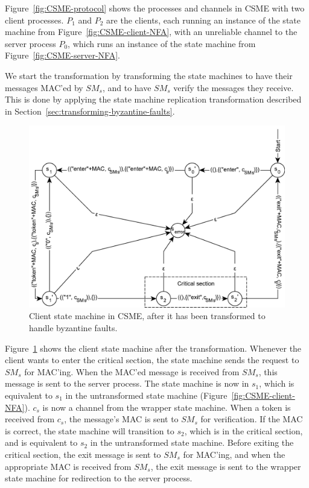 \documentclass{article}
\begin{document}
		Figure~\ref{fig:CSME-protocol} shows the processes and channels in CSME with two client processes.
		$P_1$ and $P_2$ are the clients, each running an instance of the state machine from Figure~\ref{fig:CSME-client-NFA}, with an unreliable channel to the server process $P_0$, which runs an instance of the state machine from Figure~\ref{fig:CSME-server-NFA}.

		We start the transformation by transforming the state machines to have their messages MAC'ed by $SM_s$, and to have $SM_s$ verify the messages they receive.
		This is done by applying the state machine replication transformation described in Section~\ref{sec:transforming-byzantine-faults}.

		\begin{figure}[ht]
			\center
			\includegraphics[width=\textwidth]{figures/state-machines/CSME-client-NFA-transformed.pdf}
			\caption{Client state machine in CSME, after it has been transformed to handle byzantine faults.}
			\label{fig:CSME-client-NFA-transformed}
		\end{figure}
		\FloatBarrier

		Figure~\ref{fig:CSME-client-NFA-transformed} shows the client state machine after the transformation.
		Whenever the client wants to enter the critical section, the state machine sends the request to $SM_s$ for MAC'ing.
		When the MAC'ed message is received from $SM_s$, this message is sent to the server process.
		The state machine is now in $s_1$, which is equivalent to $s_1$ in the untransformed state machine (Figure~\ref{fig:CSME-client-NFA}).
		$c_s$ is now a channel from the wrapper state machine.
		When a token is received from $c_s$, the message's MAC is sent to $SM_s$ for verification.
		If the MAC is correct, the state machine will transition to $s_2$, which is in the critical section, and is equivalent to $s_2$ in the untransformed state machine.
		Before exiting the critical section, the exit message is sent to $SM_s$ for MAC'ing, and when the appropriate MAC is received from $SM_s$, the exit message is sent to the wrapper state machine for redirection to the server process.
\end{document}
